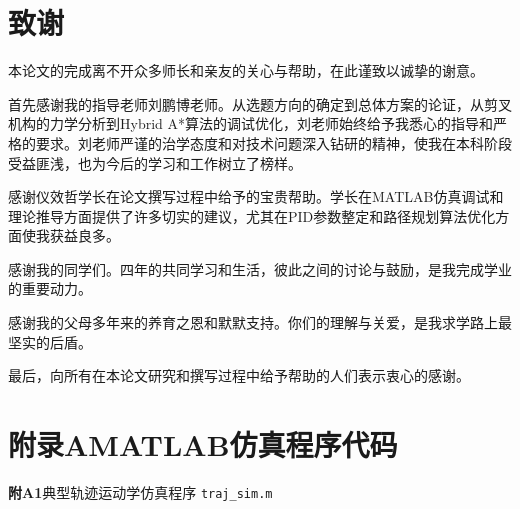 



\chapter*{\sanhao\heiti\textbf{致\qquad 谢}}

本论文的完成离不开众多师长和亲友的关心与帮助，在此谨致以诚挚的谢意。

首先感谢我的指导老师刘鹏博老师。从选题方向的确定到总体方案的论证，从剪叉机构的力学分析到Hybrid A*算法的调试优化，刘老师始终给予我悉心的指导和严格的要求。刘老师严谨的治学态度和对技术问题深入钻研的精神，使我在本科阶段受益匪浅，也为今后的学习和工作树立了榜样。

感谢仪效哲学长在论文撰写过程中给予的宝贵帮助。学长在MATLAB仿真调试和理论推导方面提供了许多切实的建议，尤其在PID参数整定和路径规划算法优化方面使我获益良多。

感谢我的同学们。四年的共同学习和生活，彼此之间的讨论与鼓励，是我完成学业的重要动力。

感谢我的父母多年来的养育之恩和默默支持。你们的理解与关爱，是我求学路上最坚实的后盾。

最后，向所有在本论文研究和撰写过程中给予帮助的人们表示衷心的感谢。



\chapter*{\sanhao\heiti\textbf{附录A\quad MATLAB仿真程序代码}}

\noindent \textbf{附A1}\quad 典型轨迹运动学仿真程序 \texttt{traj\_sim.m}



\vspace{1em}

